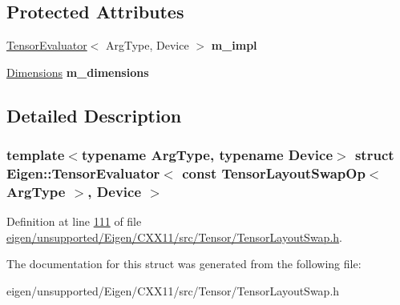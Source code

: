\subsection*{Protected Attributes}
\begin{DoxyCompactItemize}
\item 
\mbox{\label{struct_eigen_1_1_tensor_evaluator_3_01const_01_tensor_layout_swap_op_3_01_arg_type_01_4_00_01_device_01_4_aca27ee2e1cd14123d43520a6a23253b1}} 
\hyperlink{struct_eigen_1_1_tensor_evaluator}{Tensor\+Evaluator}$<$ Arg\+Type, Device $>$ {\bfseries m\+\_\+impl}
\item 
\mbox{\label{struct_eigen_1_1_tensor_evaluator_3_01const_01_tensor_layout_swap_op_3_01_arg_type_01_4_00_01_device_01_4_a03528398ac82fde301669ef96449b5db}} 
\hyperlink{struct_eigen_1_1_d_sizes}{Dimensions} {\bfseries m\+\_\+dimensions}
\end{DoxyCompactItemize}


\subsection{Detailed Description}
\subsubsection*{template$<$typename Arg\+Type, typename Device$>$\newline
struct Eigen\+::\+Tensor\+Evaluator$<$ const Tensor\+Layout\+Swap\+Op$<$ Arg\+Type $>$, Device $>$}



Definition at line \hyperlink{eigen_2unsupported_2_eigen_2_c_x_x11_2src_2_tensor_2_tensor_layout_swap_8h_source_l00111}{111} of file \hyperlink{eigen_2unsupported_2_eigen_2_c_x_x11_2src_2_tensor_2_tensor_layout_swap_8h_source}{eigen/unsupported/\+Eigen/\+C\+X\+X11/src/\+Tensor/\+Tensor\+Layout\+Swap.\+h}.



The documentation for this struct was generated from the following file\+:\begin{DoxyCompactItemize}
\item 
eigen/unsupported/\+Eigen/\+C\+X\+X11/src/\+Tensor/\+Tensor\+Layout\+Swap.\+h\end{DoxyCompactItemize}
